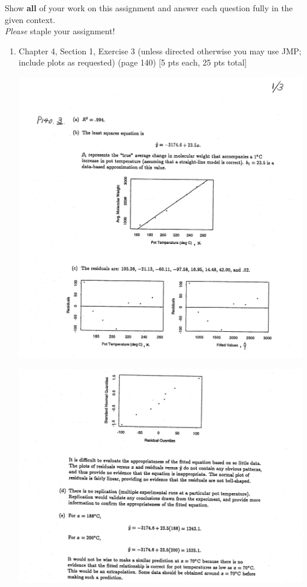 \documentclass[11pt]{article}\usepackage[]{graphicx}\usepackage[]{color}
\begin{document}

\pagestyle{fancy} 

Show \textbf{all} of your work on this assignment and answer each question fully in the given context. \\


\emph{Please} staple your assignment!

\begin{enumerate}
	
	\item Chapter 4, Section 1, Exercise 3  (unless directed otherwise you may use JMP; include plots as requested) (page 140) [5 pts each, 25 pts total]
	\begin{center}
	\begin{minipage}{\linewidth}
		\centering
		\includegraphics[width=\textwidth]{01.JPG}
	\end{minipage}
\end{center}
	\begin{center}
	\begin{minipage}{\linewidth}
		\centering
		\includegraphics[width=\textwidth]{01-2.JPG}

\end{minipage}
\end{center}
\end{enumerate}
\end{document}
